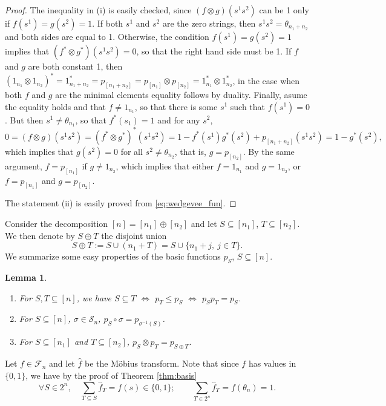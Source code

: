 \documentclass[12pt]{article}
\newtheorem{lemma}{Lemma}
\theoremstyle{definition}
\theoremstyle{remark}
\def\Fe{\mathcal F}
\def\permut{\mathscr{S}}
\begin{document}
\begin{proof} The inequality in (i) is easily  checked, since $(f\otimes g)(s^1s^2)$ can be 1 only if
$f(s^1)=g(s^2)=1$. If both $s^1$ and $s^2$ are the zero strings, then $s^1s^2=\theta_{n_1+n_2}$ and both sides
are equal to 1. Otherwise, the condition $f(s^1)=g(s^2)=1$ implies that $(f^*\otimes
g^*)(s^1s^2)=0$, so that the right hand side must be 1. If $f$ and $g$ are both
constant 1, then $(1_{n_1}\otimes 1_{n_2})^*=1_{n_1+n_2}^*=p_{[n_1+n_2]}=p_{[n_1]}\otimes
p_{[n_2]}=1_{n_1}^*\otimes
1_{n_2}^*$, in the case when both $f$
and $g$ are the minimal elements equality  follows by
duality. Finally, asume the equality holds and that $f\ne 1_{n_1}$, so that there is some $s^1$ such that 
$f(s^1)=0$. But then $s^1\ne \theta_{n_1}$, so that $f^*(s_1)=1$  and for any $s^2$,
\[
0=(f\otimes g)(s^1s^2)=(f^*\otimes
g^*)^*(s^1s^2)=1-f^*(s^1)g^*(s^2)+p_{[n_1+n_2]}(s^1s^2)=1-g^*(s^2),
\]
which implies that $g(s^2)=0$ for all $s^2\ne\theta_{n_2}$, that is, $g=p_{[n_2]}$. By the same argument,
$f=p_{[n_1]}$ if $g\ne 1_{n_2}$, which implies that either $f=1_{n_1}$ and $g=1_{n_2}$, or
$f=p_{[n_1]}$ and $g=p_{[n_2]}$.

The statement (ii) is easily proved from \eqref{eq:wedgevee_fun}.

\end{proof}

Consider the decomposition $[n]=[n_1]\oplus [n_2]$ and let $S\subseteq [n_1]$,
$T\subseteq [n_2]$. We then denote by $S\oplus T$ the disjoint union 
\begin{equation}\label{eq:disu}
S\oplus T:=S\cup (n_1+T)=S\cup\{n_1+j,\ j\in T\}.
\end{equation}
We summarize some easy properties of the basic functions $p_S$, $S\subseteq [n]$.

\begin{lemma}\label{lemma:PSPT}
\begin{enumerate}
\item[(i)] For $S,T\subseteq [n]$, we have $S\subseteq T$ $\iff$ $p_T\le p_S$ $\iff$
$p_Sp_T=p_S$.
\item[(ii)] For $S\subseteq [n]$, $\sigma\in \permut_n$,
$p_S\circ\sigma=p_{\sigma^{-1}(S)}$.
\item[(iii)] For $S\subseteq [n_1]$ and $T\subseteq [n_2]$, $p_S\otimes p_T=p_{S\oplus T}$.

\end{enumerate}
\end{lemma}

Let $f\in \Fe_n$ and let $\hat f$ be the M\"obius transform. Note that since $f$ has
values in $\{0,1\}$, we have by the proof of Theorem \ref{thm:basis}
\[
\forall S\in 2^n, \quad \sum_{T\subseteq S} \hat f_T=f(s)\in \{0,1\}; \qquad \sum_{T\in 2^n} \hat
f_T=f(\theta_n)=1.
\]
\end{document}
